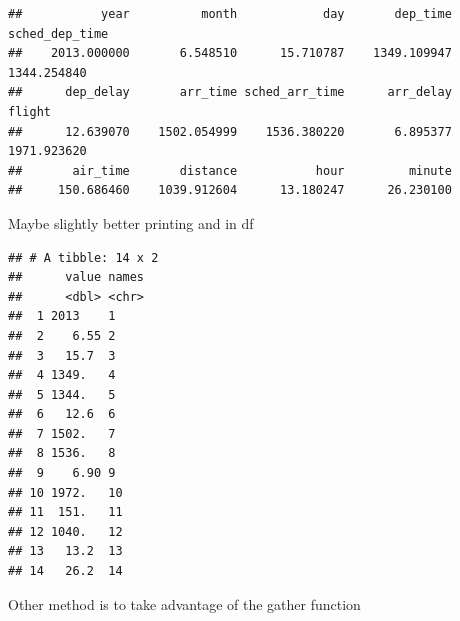 \documentclass[]{book}
\newenvironment{Shaded}{\begin{snugshade}}{\end{snugshade}}
\newcommand{\ControlFlowTok}[1]{\textcolor[rgb]{0.13,0.29,0.53}{\textbf{#1}}}
\newcommand{\DataTypeTok}[1]{\textcolor[rgb]{0.13,0.29,0.53}{#1}}
\newcommand{\KeywordTok}[1]{\textcolor[rgb]{0.13,0.29,0.53}{\textbf{#1}}}
\newcommand{\NormalTok}[1]{#1}
\newcommand{\OperatorTok}[1]{\textcolor[rgb]{0.81,0.36,0.00}{\textbf{#1}}}
\newcommand{\OtherTok}[1]{\textcolor[rgb]{0.56,0.35,0.01}{#1}}
\newcommand{\StringTok}[1]{\textcolor[rgb]{0.31,0.60,0.02}{#1}}
\theoremstyle{definition}
\theoremstyle{definition}
\theoremstyle{definition}
\theoremstyle{remark}
\begin{document}
\begin{verbatim}
##           year          month            day       dep_time sched_dep_time 
##    2013.000000       6.548510      15.710787    1349.109947    1344.254840 
##      dep_delay       arr_time sched_arr_time      arr_delay         flight 
##      12.639070    1502.054999    1536.380220       6.895377    1971.923620 
##       air_time       distance           hour         minute 
##     150.686460    1039.912604      13.180247      26.230100
\end{verbatim}

Maybe slightly better printing and in df

\begin{Shaded}
\end{Shaded}

\begin{verbatim}
## # A tibble: 14 x 2
##      value names
##      <dbl> <chr>
##  1 2013    1    
##  2    6.55 2    
##  3   15.7  3    
##  4 1349.   4    
##  5 1344.   5    
##  6   12.6  6    
##  7 1502.   7    
##  8 1536.   8    
##  9    6.90 9    
## 10 1972.   10   
## 11  151.   11   
## 12 1040.   12   
## 13   13.2  13   
## 14   26.2  14
\end{verbatim}

Other method is to take advantage of the gather function

\begin{Shaded}
\end{Shaded}
\end{document}
